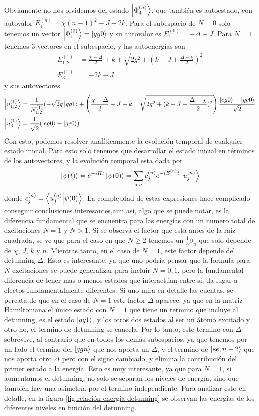 Obviamente no nos olvidemos del estado $\ket{\Phi_4^{(n)}}$, que tambi\'en es autoestado, con autovalor $E_4^{(n)}=\chi(n-1)^2-J-2k$.
Para el subespacio de $N=0$ solo tenemos un vector $\ket{\Phi_1^{(0)}}=\ket{gg0}$ y su autovalor es $E_1^{(0)}=-\Delta+J$.
Para $N=1$ tenemos 3 vectores en el subespacio, y las autoenergías son
\begin{align}
    E_{1,2}^{(1)} &=\frac{\chi -\Delta}{2} +k \pm \sqrt{2g^2+(k-J+\frac{\Delta -\chi}{2} )^2} \\
    E_3^{(1)} & = -2k-J 
\end{align}
y sus autovectores
\begin{align}
    \ket{u_{1,2}^{(1)}}&=\frac{1}{N_{1,2}^{(1)}}(-\sqrt{2}g\ket{gg1}+ \left(\frac{\chi-\Delta}{2}+J-k \mp \sqrt{2g^2+(k-J+\frac{\Delta -\chi}{2} )^2} \right)\dfrac{\ket{eg0}+\ket{ge0}}{\sqrt{2}}\\
    \ket{u_3^{(1)}}&= \frac{1}{\sqrt{2}}(\ket{eg0}-\ket{ge0})
\end{align}
Con esto, podemos resolver analíticamente la evolución temporal de cualquier estado inicial.
Para esto solo tenemos que desarrollar el estado inicial en términos de los autovectores, y la evolución temporal esta dada por
\begin{equation}
\ket{\psi(t)}=e^{-iHt}\ket{\psi(0)}=\sum_{j,n} c_j^{(n)}e^{-iE_j^{(n)}t}\ket{u_j^{(n)}}
\end{equation}
donde $c_j^{(n)}=\braket{u_j^{(n)}}{\psi(0)}$.
La complejidad de estas expresiones hace complicado conseguir conclusiones interesantes,aun asi, algo que se puede notar, es la diferencia fundamental que se encuentra para las energías con un numero total de excitaciones $N=1$ y $N>1$. Si se observa el factor que esta antes de la raiz cuadrada,  se ve que para el caso en que $N \geq 2$ tenemos un $\frac{1}{3}\beta_n$ que solo depende de $\chi$, $J$, $k$ y $n$. Mientras tanto, en el caso de $N=1$, este factor depende del detunning $\Delta$. Esto es interesante, ya que uno podría pensar que la formula para $N$ excitaciones se puede generalizar para incluir $N=0,1$, pero la fundamental diferencia de tener mas o menos estados que interactúan entre si, da lugar a efectos fundamentalmente diferentes. Si uno mira en detalle las cuentas, se percata de que en el caso de $N=1$ este factor $\Delta$ aparece, ya que en la matriz Hamiltoniana el único estado con $N=1$ que tiene un termino que incluye al detunning, es el estado $\ket{gg1}$, y los otros dos estados al ser un átomo excitado y otro no, el termino de detunning se cancela. Por lo tanto, este termino con $\Delta$ sobrevive, al contrario que en todos los demás subespacios, ya que tenemos por un lado el termino del $\ket{ggn}$ que nos aporta un $\Delta$, y el termino de $\ket{ee,n-2}$ que nos aporta otro $\Delta$ pero con el signo cambiado, y elimina la contribución del primer estado a la energía. Esto es muy interesante, ya que para $N=1$, si aumentamos el detunning, no solo se separan los niveles de energía, sino que también hay una asimetría por el termino independiente. Para analizar esto en detalle, en la figura \ref{fig:relación energia detunning} se observan las energías de los diferentes niveles en función del detunning. 

